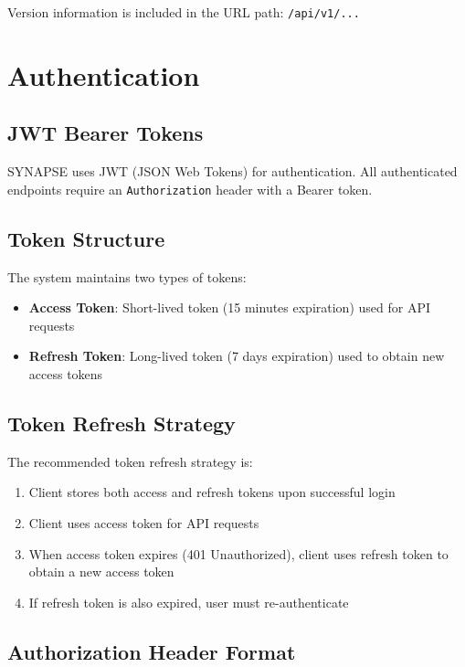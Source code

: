 \documentclass[12pt,a4paper]{report}
\begin{document}
Version information is included in the URL path: \texttt{/api/v1/...}

\chapter{Authentication}

\section{JWT Bearer Tokens}

SYNAPSE uses JWT (JSON Web Tokens) for authentication. All authenticated endpoints require an \texttt{Authorization} header with a Bearer token.

\section{Token Structure}

The system maintains two types of tokens:

\begin{itemize}
    \item \textbf{Access Token}: Short-lived token (15 minutes expiration) used for API requests
    \item \textbf{Refresh Token}: Long-lived token (7 days expiration) used to obtain new access tokens
\end{itemize}

\section{Token Refresh Strategy}

The recommended token refresh strategy is:

\begin{enumerate}
    \item Client stores both access and refresh tokens upon successful login
    \item Client uses access token for API requests
    \item When access token expires (401 Unauthorized), client uses refresh token to obtain a new access token
    \item If refresh token is also expired, user must re-authenticate
\end{enumerate}

\section{Authorization Header Format}
\end{document}
